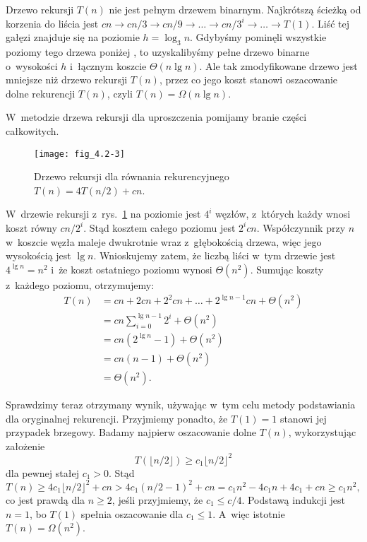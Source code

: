 \exercise %
Drzewo rekursji $T(n)$ nie jest pełnym drzewem binarnym.
Najkrótszą ścieżką od korzenia do liścia jest $cn\to cn/3\to cn/9\to\dots\to cn/3^i\to\dots\to T(1)$.
Liść tej gałęzi znajduje się na poziomie $h=\log_3n$.
Gdybyśmy pominęli wszystkie poziomy tego drzewa poniżej , to uzyskalibyśmy pełne drzewo binarne o~wysokości $h$ i~łącznym koszcie $\Theta(n\lg n)$.
Ale tak zmodyfikowane drzewo jest mniejsze niż drzewo rekursji $T(n)$, przez co jego koszt stanowi oszacowanie dolne rekurencji $T(n)$, czyli $T(n)=\Omega(n\lg n)$.

\exercise %
W~metodzie drzewa rekursji dla uproszczenia pomijamy branie części całkowitych.
\begin{figure}[ht]
	\centering \texttt{[image: fig\_4.2-3]}
	\caption{Drzewo rekursji dla równania rekurencyjnego $T(n)=4T(n/2)+cn$.} \label{fig:4.2-3}
\end{figure}
W~drzewie rekursji z~rys.\ \ref{fig:4.2-3} na  poziomie jest $4^i$ węzłów, z~których każdy wnosi koszt równy $cn/2^i$.
Stąd kosztem całego poziomu jest $2^icn$.
Współczynnik przy $n$ w~koszcie węzła maleje dwukrotnie wraz z~głębokością drzewa, więc jego wysokością jest $\lg n$.
Wnioskujemy zatem, że liczbą liści w~tym drzewie jest $4^{\lg n}=n^2$ i~że koszt ostatniego poziomu wynosi $\Theta(n^2)$.
Sumując koszty z~każdego poziomu, otrzymujemy:
\begin{align*}
	T(n) &= cn+2cn+2^2cn+\dots+2^{\lg n-1}cn+\Theta(n^2) \\
	&= cn\sum_{i=0}^{\lg n-1}2^i+\Theta(n^2) \\
	&= cn(2^{\lg n}-1)+\Theta(n^2) \\
	&= cn(n-1)+\Theta(n^2) \\
	&= \Theta(n^2).
\end{align*}

Sprawdzimy teraz otrzymany wynik, używając w~tym celu metody podstawiania dla oryginalnej rekurencji.
Przyjmiemy ponadto, że $T(1)=1$ stanowi jej przypadek brzegowy.
Badamy najpierw oszacowanie dolne $T(n)$, wykorzystując założenie
\[
	T(\lfloor n/2\rfloor) \ge c_1\lfloor n/2\rfloor^2
\]
dla pewnej stałej $c_1>0$.
Stąd
\[
	T(n) \ge 4c_1\lfloor n/2\rfloor^2+cn > 4c_1(n/2-1)^2+cn = c_1n^2-4c_1n+4c_1+cn \ge c_1n^2,
\]
co jest prawdą dla $n\ge2$, jeśli przyjmiemy, że $c_1\le c/4$.
Podstawą indukcji jest $n=1$, bo $T(1)$ spełnia oszacowanie dla $c_1\le1$.
A~więc istotnie $T(n)=\Omega(n^2)$.

